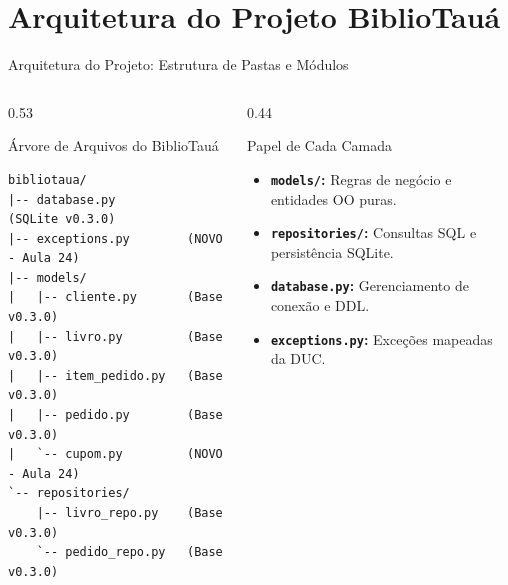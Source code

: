 \documentclass[10pt]{beamer}
\begin{document}
\section{Arquitetura do Projeto BiblioTauá}

\begin{frame}[fragile]{Arquitetura do Projeto: Estrutura de Pastas e Módulos}
\begin{columns}[T]
    \begin{column}{0.53\textwidth}
        \begin{block}{\footnotesize Árvore de Arquivos do BiblioTauá}
\begin{lstlisting}[basicstyle=\fontsize{5.8pt}{6.8pt}\ttfamily]
bibliotaua/
|-- database.py          (SQLite v0.3.0)
|-- exceptions.py        (NOVO - Aula 24)
|-- models/
|   |-- cliente.py       (Base v0.3.0)
|   |-- livro.py         (Base v0.3.0)
|   |-- item_pedido.py   (Base v0.3.0)
|   |-- pedido.py        (Base v0.3.0)
|   `-- cupom.py         (NOVO - Aula 24)
`-- repositories/
    |-- livro_repo.py    (Base v0.3.0)
    `-- pedido_repo.py   (Base v0.3.0)
\end{lstlisting}
        \end{block}
    \end{column}
    \begin{column}{0.44\textwidth}
        \begin{block}{\footnotesize Papel de Cada Camada}
        \scriptsize
        \begin{itemize}
            \item \textbf{\texttt{models/}:} Regras de negócio e entidades OO puras.
            \item \textbf{\texttt{repositories/}:} Consultas SQL e persistência SQLite.
            \item \textbf{\texttt{database.py}:} Gerenciamento de conexão e DDL.
            \item \textbf{\texttt{exceptions.py}:} Exceções mapeadas da DUC.
        \end{itemize}
        \end{block}
    \end{column}
\end{columns}
\end{frame}
\end{document}

